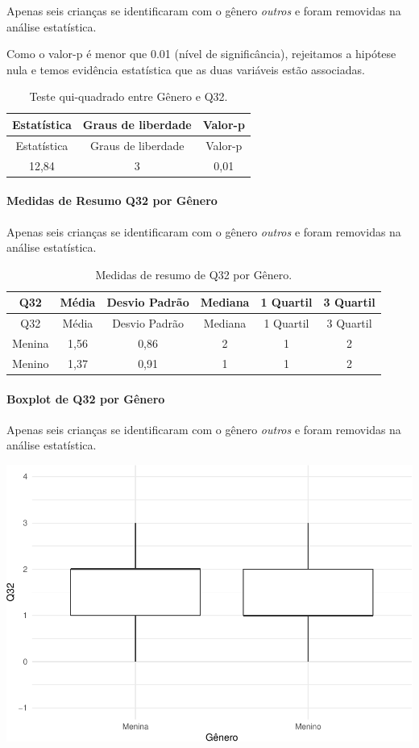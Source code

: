 \documentclass[]{article}
\let\oldparagraph\paragraph
\renewcommand{\paragraph}[1]{\oldparagraph{#1}\mbox{}}
\begin{document}
Apenas seis crianças se identificaram com o gênero \emph{outros} e foram removidas na análise estatística.

Como o valor-p é menor que 0.01 (nível de significância), rejeitamos a hipótese nula e temos evidência estatística que as duas variáveis estão associadas.

\begin{longtable}[]{@{}ccc@{}}
\caption{\label{tab:unnamed-chunk-1088}Teste qui-quadrado entre Gênero e Q32.}\tabularnewline
\toprule
Estatística & Graus de liberdade & Valor-p\tabularnewline
\midrule
\endfirsthead
\toprule
Estatística & Graus de liberdade & Valor-p\tabularnewline
\midrule
\endhead
12,84 & 3 & 0,01\tabularnewline
\bottomrule
\end{longtable}

\cleardoublepage

\hypertarget{medidas-de-resumo-q32-por-guxeanero}{%
\paragraph{Medidas de Resumo Q32 por Gênero}\label{medidas-de-resumo-q32-por-guxeanero}}

Apenas seis crianças se identificaram com o gênero \emph{outros} e foram removidas na análise estatística.

\begin{longtable}[]{@{}cccccc@{}}
\caption{\label{tab:unnamed-chunk-1089}Medidas de resumo de Q32 por Gênero.}\tabularnewline
\toprule
Q32 & Média & Desvio Padrão & Mediana & 1 Quartil & 3 Quartil\tabularnewline
\midrule
\endfirsthead
\toprule
Q32 & Média & Desvio Padrão & Mediana & 1 Quartil & 3 Quartil\tabularnewline
\midrule
\endhead
Menina & 1,56 & 0,86 & 2 & 1 & 2\tabularnewline
Menino & 1,37 & 0,91 & 1 & 1 & 2\tabularnewline
\bottomrule
\end{longtable}

\hypertarget{boxplot-de-q32-por-guxeanero}{%
\paragraph{Boxplot de Q32 por Gênero}\label{boxplot-de-q32-por-guxeanero}}

Apenas seis crianças se identificaram com o gênero \emph{outros} e foram removidas na análise estatística.

\begin{center}\includegraphics[width=0.75\linewidth]{relatorio_covid19_files/figure-latex/unnamed-chunk-1090-1} \end{center}
\end{document}
